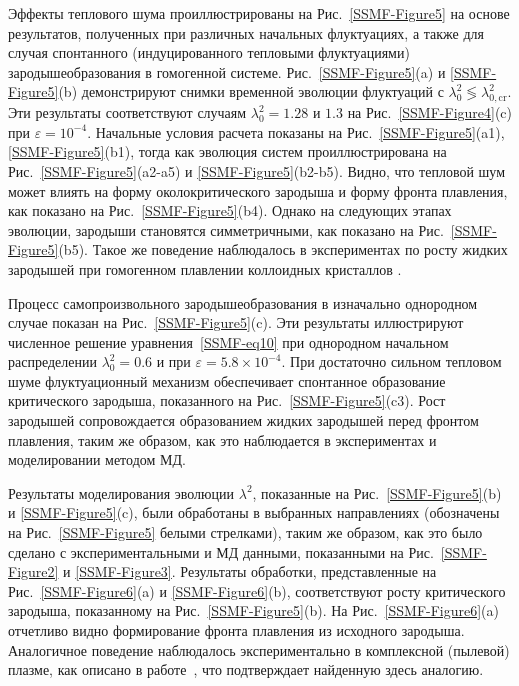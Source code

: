 Эффекты теплового шума проиллюстрированы на Рис.~\ref{SSMF-Figure5} на основе результатов, полученных при различных начальных флуктуациях, а также для случая спонтанного (индуцированного тепловыми флуктуациями) зародышеобразования в гомогенной системе.
Рис.~\ref{SSMF-Figure5}(a) и \ref{SSMF-Figure5}(b) демонстрируют снимки временной эволюции флуктуаций с $\lambda^2_0 \lessgtr \lambda^2_{0,\mathrm{cr}}$.
Эти результаты соответствуют случаям $\lambda_0^2 =1.28$ и $1.3$ на Рис.~\ref{SSMF-Figure4}(c) при $\varepsilon = 10^{-4}$.
Начальные условия расчета показаны на Рис.~\ref{SSMF-Figure5}(a1), \ref{SSMF-Figure5}(b1),
тогда как эволюция систем проиллюстрирована на Рис.~\ref{SSMF-Figure5}(a2-a5) и \ref{SSMF-Figure5}(b2-b5).
Видно, что тепловой шум может влиять на форму околокритического зародыша и форму фронта плавления, как показано на Рис.~\ref{SSMF-Figure5}(b4).
Однако на следующих этапах эволюции, зародыши становятся симметричными, как показано на Рис.~\ref{SSMF-Figure5}(b5).
Такое же поведение наблюдалось в экспериментах по росту жидких зародышей при гомогенном плавлении коллоидных кристаллов \cite{10.1038/ncomms7942}.

Процесс самопроизвольного зародышеобразования в изначально однородном случае показан на Рис.~\ref{SSMF-Figure5}(c).
Эти результаты иллюстрируют численное решение уравнения~\eqref{SSMF-eq10} при однородном начальном распределении $\lambda_0^2 = 0.6$ и при $\varepsilon=5.8\times10^{-4}$.
При достаточно сильном тепловом шуме флуктуационный механизм обеспечивает спонтанное образование критического зародыша, показанного на Рис.~\ref{SSMF-Figure5}(c3).
Рост зародышей сопровождается образованием жидких зародышей перед фронтом плавления, таким же образом, как это наблюдается в экспериментах и моделировании методом МД.


Результаты моделирования эволюции $\lambda^2$, показанные на Рис.~\ref{SSMF-Figure5}(b) и \ref{SSMF-Figure5}(c), были обработаны в выбранных направлениях (обозначены на Рис.~\ref{SSMF-Figure5} белыми стрелками), таким же образом, как это было сделано с экспериментальными и МД данными, показанными на Рис.~\ref{SSMF-Figure2} и \ref{SSMF-Figure3}.
Результаты обработки, представленные на Рис.~\ref{SSMF-Figure6}(a) и \ref{SSMF-Figure6}(b), соответствуют росту критического зародыша, показанному на Рис.~\ref{SSMF-Figure5}(b). На Рис.~\ref{SSMF-Figure6}(a) отчетливо видно формирование фронта плавления из исходного зародыша.
Аналогичное поведение наблюдалось экспериментально в комплексной (пылевой) плазме, как описано в работе~\cite{10.1103/physreve.97.043206}, что подтверждает найденную здесь аналогию.

